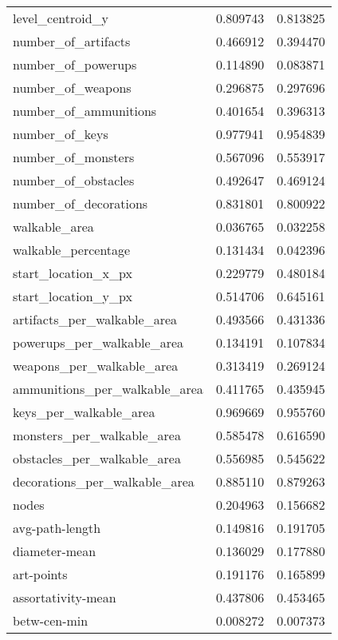\documentclass{report}
\begin{document}
\begin{longtable}{lrr}
	level\_centroid\_y              &  0.809743 &  0.813825 \\
	number\_of\_artifacts           &  0.466912 &  0.394470 \\
	number\_of\_powerups            &  0.114890 &  0.083871 \\
	number\_of\_weapons             &  0.296875 &  0.297696 \\
	number\_of\_ammunitions         &  0.401654 &  0.396313 \\
	number\_of\_keys                &  0.977941 &  0.954839 \\
	number\_of\_monsters            &  0.567096 &  0.553917 \\
	number\_of\_obstacles           &  0.492647 &  0.469124 \\
	number\_of\_decorations         &  0.831801 &  0.800922 \\
	walkable\_area                 &  0.036765 &  0.032258 \\
	walkable\_percentage           &  0.131434 &  0.042396 \\
	start\_location\_x\_px           &  0.229779 &  0.480184 \\
	start\_location\_y\_px           &  0.514706 &  0.645161 \\
	artifacts\_per\_walkable\_area   &  0.493566 &  0.431336 \\
	powerups\_per\_walkable\_area    &  0.134191 &  0.107834 \\
	weapons\_per\_walkable\_area     &  0.313419 &  0.269124 \\
	ammunitions\_per\_walkable\_area &  0.411765 &  0.435945 \\
	keys\_per\_walkable\_area        &  0.969669 &  0.955760 \\
	monsters\_per\_walkable\_area    &  0.585478 &  0.616590 \\
	obstacles\_per\_walkable\_area   &  0.556985 &  0.545622 \\
	decorations\_per\_walkable\_area &  0.885110 &  0.879263 \\
	nodes                         &  0.204963 &  0.156682 \\
	avg-path-length               &  0.149816 &  0.191705 \\
	diameter-mean                 &  0.136029 &  0.177880 \\
	art-points                    &  0.191176 &  0.165899 \\
	assortativity-mean            &  0.437806 &  0.453465 \\
	betw-cen-min                  &  0.008272 &  0.007373 \\

\end{longtable}
\end{document}
